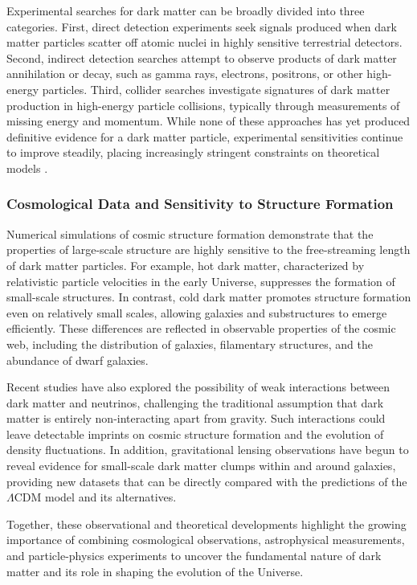 Experimental searches for dark matter can be broadly divided into three categories. First, direct detection experiments seek signals produced when dark matter particles scatter off atomic nuclei in highly sensitive terrestrial detectors. Second, indirect detection searches attempt to observe products of dark matter annihilation or decay, such as gamma rays, electrons, positrons, or other high-energy particles. Third, collider searches investigate signatures of dark matter production in high-energy particle collisions, typically through measurements of missing energy and momentum. While none of these approaches has yet produced definitive evidence for a dark matter particle, experimental sensitivities continue to improve steadily, placing increasingly stringent constraints on theoretical models \cite{billard2022}.

\subsubsection{Cosmological Data and Sensitivity to Structure Formation}

Numerical simulations of cosmic structure formation demonstrate that the properties of large-scale structure are highly sensitive to the free-streaming length of dark matter particles. For example, hot dark matter, characterized by relativistic particle velocities in the early Universe, suppresses the formation of small-scale structures. In contrast, cold dark matter promotes structure formation even on relatively small scales, allowing galaxies and substructures to emerge efficiently. These differences are reflected in observable properties of the cosmic web, including the distribution of galaxies, filamentary structures, and the abundance of dwarf galaxies.

Recent studies have also explored the possibility of weak interactions between dark matter and neutrinos, challenging the traditional assumption that dark matter is entirely non-interacting apart from gravity. Such interactions could leave detectable imprints on cosmic structure formation and the evolution of density fluctuations. In addition, gravitational lensing observations have begun to reveal evidence for small-scale dark matter clumps within and around galaxies, providing new datasets that can be directly compared with the predictions of the $\Lambda$CDM model and its alternatives.

Together, these observational and theoretical developments highlight the growing importance of combining cosmological observations, astrophysical measurements, and particle-physics experiments to uncover the fundamental nature of dark matter and its role in shaping the evolution of the Universe.

